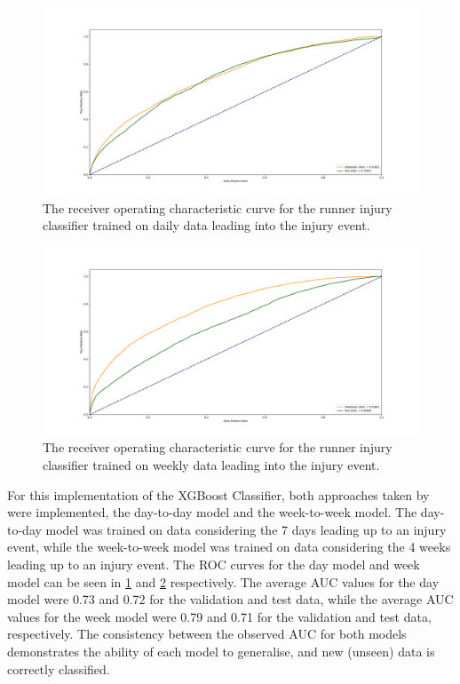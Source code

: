 \begin{figure}[ht]
  \centering
  \includegraphics[width=\textwidth]{figures/day_ROC.pdf}
  \captionsetup{justification=centering,width=0.8\textwidth}
  \caption[Runner Injury Day Model ROC Curve]{\label{fig:day_roc}The receiver operating characteristic curve for the runner injury classifier trained on daily data leading into the injury event.}
\end{figure}
\begin{figure}[ht]
  \centering
  \includegraphics[width=\textwidth]{figures/week_ROC.pdf}
  \captionsetup{justification=centering,width=0.8\textwidth}
  \caption[Runner Injury Day Model ROC Curve]{\label{fig:week_roc}The receiver operating characteristic curve for the runner injury classifier trained on weekly data leading into the injury event.}
\end{figure}

For this implementation of the XGBoost Classifier, both approaches taken by \textcite{Lovdal2021} were implemented, the day-to-day model and the week-to-week model. The day-to-day model was trained on data considering the 7 days leading up to an injury event, while the week-to-week model was trained on data considering the 4 weeks leading up to an injury event. The ROC curves for the day model and week model can be seen in \ref{fig:day_roc} and \ref{fig:week_roc} respectively. The average AUC values for the day model were 0.73 and 0.72 for the validation and test data, while the average AUC values for the week model were 0.79 and 0.71 for the validation and test data, respectively. The consistency between the observed AUC for both models demonstrates the ability of each model to generalise, and new (unseen) data is correctly classified.

